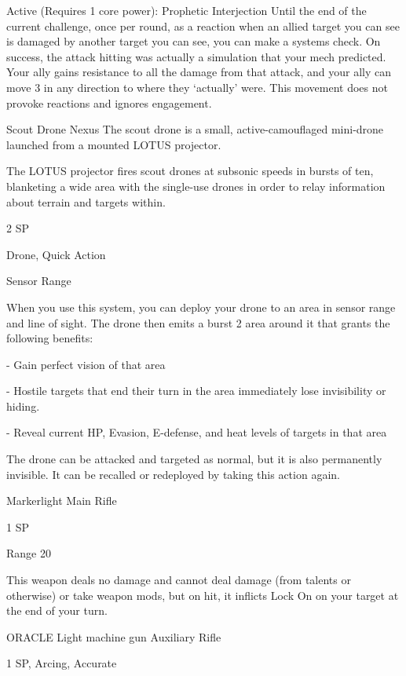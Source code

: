   Active (Requires 1 core power): Prophetic Interjection  
  Until the end of the current challenge, once per round, as a reaction when an allied target you can see  
  is damaged by another target you can see, you can make a systems check. On success, the attack  
  hitting was actually a simulation that your mech predicted. Your ally gains resistance to all the damage  
  from that attack, and your ally can move 3 in any direction to where they ‘actually’ were. This  
  movement does not provoke reactions and ignores engagement. 

Scout Drone Nexus  
The scout drone is a small, active-camouflaged mini-drone launched from a mounted LOTUS projector.  

The LOTUS projector fires scout drones at subsonic speeds in bursts of ten, blanketing a wide area with  
the single-use drones in order to relay information about terrain and targets within.    

2 SP
 
Drone, Quick Action
 

                                                                                                                 


Sensor Range
 
When you use this system, you can deploy your drone to an area in sensor range and line of  
sight. The drone then emits a burst 2 area around it that grants the following benefits:
 
  - Gain perfect vision of that area
 
  - Hostile targets that end their turn in the area immediately lose invisibility or hiding.
 
  - Reveal current HP, Evasion, E-defense, and heat levels of targets in that area
 
The drone can be attacked and targeted as normal, but it is also permanently invisible. It can be  
recalled or redeployed by taking this action again.
 

Markerlight  
Main Rifle
 
1 SP
 
Range 20
 

This weapon deals no damage and cannot deal damage (from talents or otherwise) or take  
weapon mods, but on hit, it inflicts Lock On on your target at the end of your turn.
 

ORACLE Light machine gun  
Auxiliary Rifle
 
1 SP, Arcing, Accurate
 
